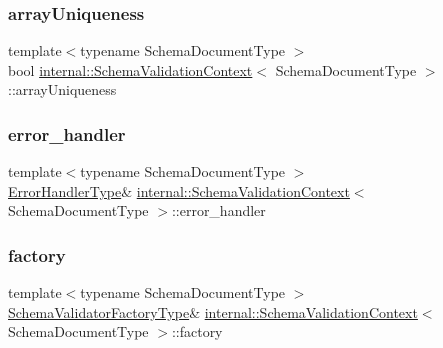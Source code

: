 \subsubsection{\texorpdfstring{array\+Uniqueness}{arrayUniqueness}}
{\footnotesize\ttfamily template$<$typename Schema\+Document\+Type $>$ \\
bool \hyperlink{structinternal_1_1SchemaValidationContext}{internal\+::\+Schema\+Validation\+Context}$<$ Schema\+Document\+Type $>$\+::array\+Uniqueness}

\mbox{\label{structinternal_1_1SchemaValidationContext_ad85d300184c10bf45b0852b6b26d118d}} 
\subsubsection{\texorpdfstring{error\+\_\+handler}{error\_handler}}
{\footnotesize\ttfamily template$<$typename Schema\+Document\+Type $>$ \\
\hyperlink{structinternal_1_1SchemaValidationContext_a4d015d68e8957c254b84af5f3550b2f3}{Error\+Handler\+Type}\& \hyperlink{structinternal_1_1SchemaValidationContext}{internal\+::\+Schema\+Validation\+Context}$<$ Schema\+Document\+Type $>$\+::error\+\_\+handler}

\mbox{\label{structinternal_1_1SchemaValidationContext_ae2661ad92602b4f12fbffadb3dab502e}} 
\subsubsection{\texorpdfstring{factory}{factory}}
{\footnotesize\ttfamily template$<$typename Schema\+Document\+Type $>$ \\
\hyperlink{structinternal_1_1SchemaValidationContext_a33fa91fd8e880d1adb9b891fe441f110}{Schema\+Validator\+Factory\+Type}\& \hyperlink{structinternal_1_1SchemaValidationContext}{internal\+::\+Schema\+Validation\+Context}$<$ Schema\+Document\+Type $>$\+::factory}

